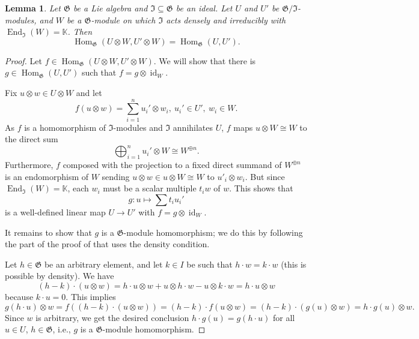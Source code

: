 \documentclass[11pt]{article}
\theoremstyle{plain}
\newtheorem{lemma}{Lemma}[section]
\theoremstyle{nonumberplain}
\theoremstyle{plain}
\theoremstyle{nonumberplain}
\newtheorem{proof}{Proof}
\newcommand\bK{{\mathbb K}}
\newcommand\fG{\mathfrak{G}}
\DeclareMathOperator{\id}{id}
\DeclareMathOperator{\End}{\mathrm{End}}
\DeclareMathOperator{\Hom}{\mathrm{Hom}}
\begin{document}
\begin{lemma}\label{le.hom_split}
  Let $\fG$ be a Lie algebra and $\mathfrak{I}\subseteq \fG$ be an ideal. Let $U$ and $U'$ be $\fG/\mathfrak{I}$-modules, and $W$ be a $\fG$-module on which $\mathfrak{I}$ acts densely and irreducibly with $\End_\mathfrak{I}(W)=\bK$. Then 
  \begin{equation*}
    \Hom_{\fG}(U\otimes W,U'\otimes W) = \Hom_{\fG}(U,U').
  \end{equation*}
\end{lemma}
\begin{proof}
Let $f\in\Hom_{\fG}(U\otimes W,U'\otimes W)$. We will show that there is $g\in\Hom_{\fG}(U,U')$ such that $f=g\otimes\id_W$.

Fix $u\otimes w\in U\otimes W$ and let
\begin{equation*}
  f(u\otimes w)=\sum_{i=1}^n u_i'\otimes w_i,\ u_i'\in U',\ w_i\in W. 
\end{equation*}
As $f$ is a homomorphism of $\mathfrak{I}$-modules and $\mathfrak{I}$ annihilates $U$, $f$ maps $u\otimes W\cong W$ to the direct sum 
\begin{equation*}
 \bigoplus_{i=1}^n  u_i'\otimes W\cong W^{\oplus n}.  
\end{equation*}
Furthermore, $f$ composed with the projection to a fixed direct summand of $W^{\oplus n}$ is an endomorphism of $W$ sending $u\otimes w\in u\otimes W\cong W$ to $u'_i\otimes w_i$.  But since $\End_\mathfrak{I}(W)=\bK$, each $w_i$ must be a scalar multiple $t_iw$ of $w$.  This shows that
\begin{equation*}
  g:u\mapsto \sum t_iu_i'
\end{equation*}
is a well-defined linear map $U\to U'$ with $f=g\otimes\id_W$. 

It remains to show that $g$ is a $\fG$-module homomorphism; we do this by following the part of the proof of \cite[Lemma 3]{Chi14} that uses the density condition. 

Let $h\in \fG$ be an arbitrary element, and let $k\in I$ be such that $h\cdot w = k\cdot w$ (this is possible by density). We have
\begin{equation*}
  (h-k)\cdot(u\otimes w) = h\cdot u\otimes w+u\otimes h\cdot w-u\otimes k\cdot w = h\cdot u\otimes w
\end{equation*}
because $k\cdot u=0$. This implies
\begin{equation*}
  g(h\cdot u)\otimes w = f((h-k)\cdot(u\otimes w)) =(h-k)\cdot f(u\otimes w) = (h-k)\cdot(g(u)\otimes w) = h\cdot g(u)\otimes w. 
\end{equation*}
Since $w$ is arbitrary, we get the desired conclusion $h\cdot g(u) = g(h\cdot u)$ for all $u\in U$, $h\in\fG$, i.e., $g$ is a $\fG$-module homomorphism. 
\end{proof}
\end{document}
